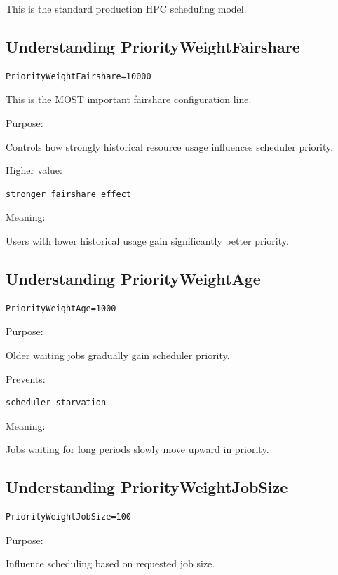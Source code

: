 \documentclass[11pt]{article}
\begin{document}
This is the standard production HPC scheduling model.
\subsection{Understanding PriorityWeightFairshare}
\label{sec:org818f20d}

\begin{verbatim}
PriorityWeightFairshare=10000
\end{verbatim}

This is the MOST important fairshare configuration line.

Purpose:

Controls how strongly historical resource usage influences scheduler
priority.

Higher value:

\begin{verbatim}
stronger fairshare effect
\end{verbatim}

Meaning:

Users with lower historical usage gain significantly better priority.
\subsection{Understanding PriorityWeightAge}
\label{sec:org51f197e}

\begin{verbatim}
PriorityWeightAge=1000
\end{verbatim}

Purpose:

Older waiting jobs gradually gain scheduler priority.

Prevents:

\begin{verbatim}
scheduler starvation
\end{verbatim}

Meaning:

Jobs waiting for long periods slowly move upward in priority.
\subsection{Understanding PriorityWeightJobSize}
\label{sec:org2ded258}

\begin{verbatim}
PriorityWeightJobSize=100
\end{verbatim}

Purpose:

Influence scheduling based on requested job size.
\end{document}
